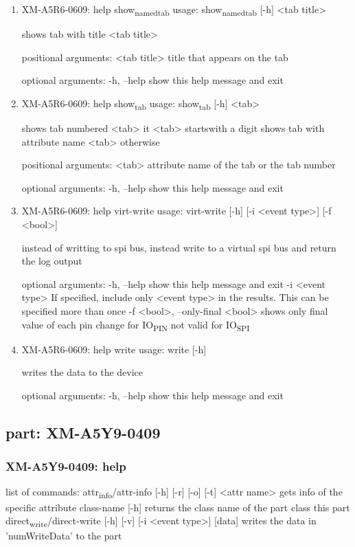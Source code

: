 \documentclass[11pt]{article}
\begin{document}
\begin{enumerate}
\item XM-A5R6-0609: help show\textsubscript{named}\textsubscript{tab}
\label{sec:orgded3775}
usage: show\textsubscript{named}\textsubscript{tab} [-h] <tab title>

shows tab with title <tab title>

positional arguments:
  <tab title>  title that appears on the tab

optional arguments:
  -h, --help   show this help message and exit

\item XM-A5R6-0609: help show\textsubscript{tab}
\label{sec:org86562df}
usage: show\textsubscript{tab} [-h] <tab>

shows tab numbered <tab> it <tab> startswith a digit shows tab with attribute
name <tab> otherwise

positional arguments:
  <tab>       attribute name of the tab or the tab number

optional arguments:
  -h, --help  show this help message and exit

\item XM-A5R6-0609: help virt-write
\label{sec:orgb4ecd7d}
usage: virt-write [-h] [-i <event type>] [-f <bool>]

instead of writting to spi bus, instead write to a virtual spi bus and return
the log output

optional arguments:
  -h, --help            show this help message and exit
  -i <event type>       If specified, include only <event type> in the
                        results. This can be specified more than once
  -f <bool>, --only-final <bool>
                        shows only final value of each pin change for IO\textsubscript{PIN}
                        not valid for IO\textsubscript{SPI}

\item XM-A5R6-0609: help write
\label{sec:org01e69d0}
usage: write [-h]

writes the data to the device

optional arguments:
  -h, --help  show this help message and exit
\end{enumerate}

\subsection{part: XM-A5Y9-0409}
\label{sec:org61d3dd1}
\subsubsection{XM-A5Y9-0409: help}
\label{sec:org285b249}
list of commands:
  attr\textsubscript{info}/attr-info [-h] [-r] [-o] [-t] <attr name>
    gets info of the specific attribute
  class-name [-h]
    returns the class name of the part class this part
  direct\textsubscript{write}/direct-write [-h] [-v] [-i <event type>] [data]
    writes the data in 'numWriteData' to the part
\end{document}
